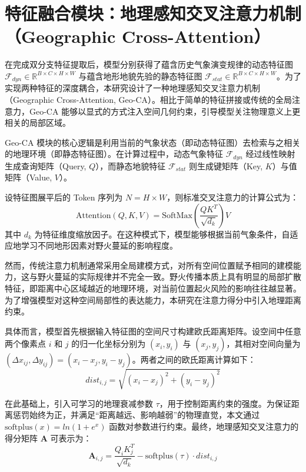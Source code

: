 \section{特征融合模块：地理感知交叉注意力机制（Geographic Cross-Attention）}
\label{sec:3-4}
在完成双分支特征提取后，模型分别获得了蕴含历史气象演变规律的动态特征图 $\mathcal{F}_{dyn} \in \mathbb{R}^{B \times C \times H \times W}$ 与蕴含地形地貌先验的静态特征图 $\mathcal{F}_{stat} \in \mathbb{R}^{B \times C \times H \times W}$。为了实现两种特征的深度耦合，本研究设计了一种地理感知交叉注意力机制（Geographic Cross-Attention, Geo-CA）。相比于简单的特征拼接或传统的全局注意力，Geo-CA 能够以显式的方式注入空间几何约束，引导模型关注物理意义上更相关的局部区域。

Geo-CA 模块的核心逻辑是利用当前的气象状态（即动态特征图）去检索与之相关的地理环境（即静态特征图）。在计算过程中，动态气象特征 $\mathcal{F}_{dyn}$ 经过线性映射生成查询矩阵（Query, $Q$），而静态地貌特征 $\mathcal{F}_{stat}$ 则生成键矩阵（Key, $K$）与值矩阵（Value, $V$）。

设特征图展平后的 Token 序列为 $N = H \times W$，则标准交叉注意力的计算公式为：
\begin{equation}
    \text{Attention}(Q, K, V) = \text{SoftMax}\left(\frac{QK^T}{\sqrt{d_k}}\right)V
\end{equation}
其中 $d_k$ 为特征维度缩放因子。在这种模式下，模型能够根据当前气象条件，自适应地学习不同地形因素对野火蔓延的影响程度。

然而，传统注意力机制通常采用全局建模方式，对所有空间位置赋予相同的建模能力，这与野火蔓延的实际规律并不完全一致。野火传播本质上具有明显的局部扩散特征，即距离中心区域越近的地理环境，对当前位置起火风险的影响往往越显著。为了增强模型对这种空间局部性的表达能力，本研究在注意力得分中引入地理距离约束。

具体而言，模型首先根据输入特征图的空间尺寸构建欧氏距离矩阵。设空间中任意两个像素点 $i$ 和 $j$ 的归一化坐标分别为 $(x_i, y_i)$ 与 $(x_j, y_j)$，其相对空间向量为 $(\Delta x_{ij}, \Delta y_{ij}) = (x_i - x_j, y_i - y_j)$。两者之间的欧氏距离计算如下：
\begin{equation}
    dist_{i,j} = \sqrt{(x_i - x_j)^2 + (y_i - y_j)^2}
\end{equation}

在此基础上，引入可学习的地理衰减参数 $\tau$，用于控制距离约束的强度。为保证距离惩罚始终为正，并满足“距离越远、影响越弱”的物理直觉，本文通过 $\text{softplus}(x)=ln(1+e^x)$ 函数对参数进行约束。最终，地理感知交叉注意力的得分矩阵 $\mathbf{A}$ 可表示为：
\begin{equation}
    \mathbf{A}_{i,j} = \frac{Q_i K_j^T}{\sqrt{d_k}} - \text{softplus}(\tau) \cdot dist_{i,j}
\end{equation}

